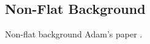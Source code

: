 \documentclass[../AnalysisNoteJBuxton.tex]{subfiles}
\begin{document}
\subsection{Non-Flat Background}
\label{NonFlatBackground}


Non-flat background
Adam's paper \cite{Kisiel:2017}.
\end{document}

